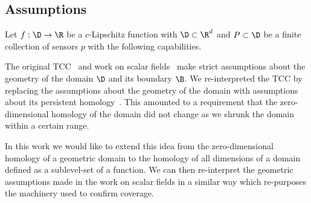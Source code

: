 
\subsection{Assumptions}\label{ssec:assumptions}

Let $f:\D\to\R$ be a $c$-Lipschitz function with $\D\subset\R^d$ and $P\subset \D$ be a finite collection of sensors $p$ with the following capabilities.

\vspace{3ex}
\begin{center}
\setlength{\fboxsep}{2ex}
\end{center}\vspace{3ex}

The original TCC~\cite{desilva07coverage} and work on scalar fields~\cite{chazal09analysis} make strict assumptions about the geometry of the domain $\D$ and its boundary $\B$.
We re-interpreted the TCC by replacing the assumptions about the geometry of the domain with assumptions about its persistent homology~\cite{cavanna2017when}.
This amounted to a requirement that the zero-dimensional homology of the domain did not change as we shrunk the domain within a certain range.

In this work we would like to extend this idea from the zero-dimensional homology of a geometric domain to the homology of all dimensions of a domain defined as a sublevel-set of a function.
We can then re-interpret the geometric assumptions made in the work on scalar fields in a similar way which re-purposes the machinery used to confirm coverage.

